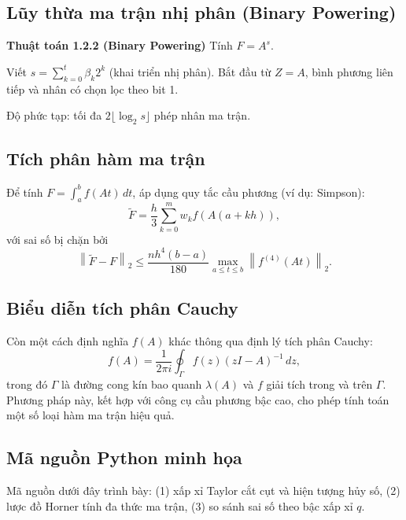 \documentclass[12pt,a4paper]{report}
\newcommand{\norm}[1]{\left\lVert #1 \right\rVert}
\begin{document}
\subsection{Lũy thừa ma trận nhị phân (Binary Powering)}

\begin{algobox}
\textbf{Thuật toán 1.2.2 (Binary Powering)} \quad Tính $F = A^s$.

\medskip
Viết $s = \sum_{k=0}^{t} \beta_k 2^k$ (khai triển nhị phân). Bắt đầu từ $Z = A$,
bình phương liên tiếp và nhân có chọn lọc theo bit 1.

\medskip
Độ phức tạp: tối đa $2\lfloor \log_2 s \rfloor$ phép nhân ma trận.
\end{algobox}

\subsection{Tích phân hàm ma trận}

Để tính $F = \int_a^b f(At)\,dt$, áp dụng quy tắc cầu phương (ví dụ: Simpson):
\[
  \tilde{F} = \frac{h}{3}\sum_{k=0}^{m} w_k f(A(a + kh)),
\]
với sai số bị chặn bởi
\[
  \norm{\tilde{F} - F}_2 \le \frac{n h^4 (b-a)}{180}
  \max_{a \le t \le b} \norm{f^{(4)}(At)}_2.
\]

\subsection{Biểu diễn tích phân Cauchy}

Còn một cách định nghĩa $f(A)$ khác thông qua định lý tích phân Cauchy:
\[
  f(A) = \frac{1}{2\pi i} \oint_\Gamma f(z)(zI - A)^{-1}\,dz,
\]
trong đó $\Gamma$ là đường cong kín bao quanh $\lambda(A)$ và $f$ giải tích trong
và trên $\Gamma$. Phương pháp này, kết hợp với công cụ cầu phương bậc cao, cho phép
tính toán một số loại hàm ma trận hiệu quả.

\subsection{Mã nguồn Python minh họa}

Mã nguồn dưới đây trình bày: (1) xấp xỉ Taylor cắt cụt và hiện tượng hủy số,
(2) lược đồ Horner tính đa thức ma trận, (3) so sánh sai số theo bậc xấp xỉ $q$.
\end{document}
